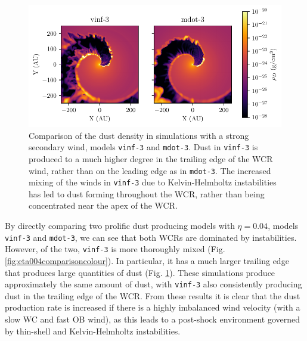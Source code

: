 \documentclass[fleqn,usenatbib]{mnras}
\begin{document}
\begin{figure}
  \centering
  \includegraphics[width=\linewidth]{assets/results/mixed/eta-004-comparison-rhod.pdf}
  \caption[Comparison of dust density in simulations with strong secondary wind]{Comparison of the dust density in simulations with a strong secondary wind, models \texttt{vinf-3} and \texttt{mdot-3}. Dust in \texttt{vinf-3} is produced to a much higher degree in the trailing edge of the WCR wind, rather than on the leading edge as in \texttt{mdot-3}. The increased mixing of the winds in \texttt{vinf-3} due to Kelvin-Helmholtz instabilities has led to dust forming throughout the WCR, rather than being concentrated near the apex of the WCR.}
  \label{fig:eta004comparisonrhod}
\end{figure}

By directly comparing two prolific dust producing models with $\eta = 0.04$, models \texttt{vinf-3} and \texttt{mdot-3}, we can see that both WCRs are dominated by instabilities.
However, of the two, \texttt{vinf-3} is more thoroughly mixed (Fig. \ref{fig:eta004comparisoncolour}).
In particular, it has a much larger trailing edge that produces large quantities of dust (Fig. \ref{fig:eta004comparisonrhod}).
These simulations produce approximately the same amount of dust, with \texttt{vinf-3} also consistently producing dust in the trailing edge of the WCR.
From these results it is clear that the dust production rate is increased if there is a highly imbalanced wind velocity (with a slow WC and fast OB wind), as this leads to a post-shock environment governed by thin-shell and Kelvin-Helmholtz instabilities.

\end{document}

